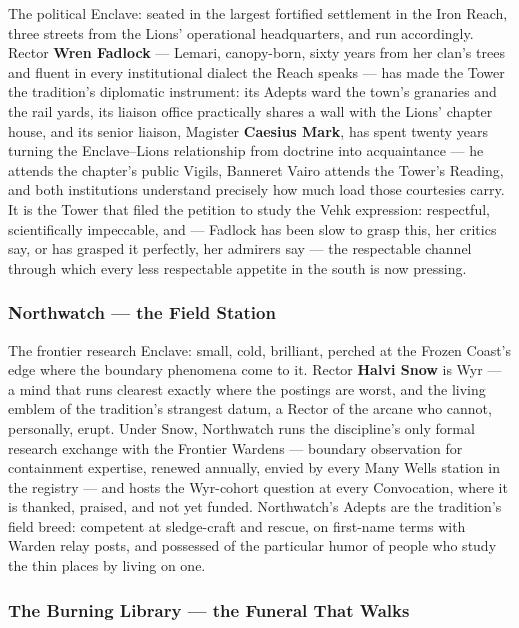 The political Enclave: seated in the largest fortified settlement in the Iron Reach, three streets from the Lions' operational headquarters, and run accordingly. Rector \textbf{Wren Fadlock} --- Lemari, canopy-born, sixty years from her clan's trees and fluent in every institutional dialect the Reach speaks --- has made the Tower the tradition's diplomatic instrument: its Adepts ward the town's granaries and the rail yards, its liaison office practically shares a wall with the Lions' chapter house, and its senior liaison, Magister \textbf{Caesius Mark}, has spent twenty years turning the Enclave--Lions relationship from doctrine into acquaintance --- he attends the chapter's public Vigils, Banneret Vairo attends the Tower's Reading, and both institutions understand precisely how much load those courtesies carry. It is the Tower that filed the petition to study the Vehk expression: respectful, scientifically impeccable, and --- Fadlock has been slow to grasp this, her critics say, or has grasped it perfectly, her admirers say --- the respectable channel through which every less respectable appetite in the south is now pressing.

\subsubsection{Northwatch --- the Field Station}

The frontier research Enclave: small, cold, brilliant, perched at the Frozen Coast's edge where the boundary phenomena come to it. Rector \textbf{Halvi Snow} is Wyr --- a mind that runs clearest exactly where the postings are worst, and the living emblem of the tradition's strangest datum, a Rector of the arcane who cannot, personally, erupt. Under Snow, Northwatch runs the discipline's only formal research exchange with the Frontier Wardens --- boundary observation for containment expertise, renewed annually, envied by every Many Wells station in the registry --- and hosts the Wyr-cohort question at every Convocation, where it is thanked, praised, and not yet funded. Northwatch's Adepts are the tradition's field breed: competent at sledge-craft and rescue, on first-name terms with Warden relay posts, and possessed of the particular humor of people who study the thin places by living on one.

\subsubsection{The Burning Library --- the Funeral That Walks}

